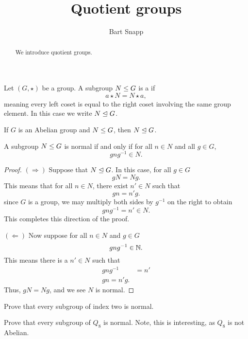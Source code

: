 \documentclass{ximera}
\author{Bart Snapp}
\title{Quotient groups}
\begin{document}
\begin{abstract}
  We introduce quotient groups.
\end{abstract}
\maketitle

\begin{definition}
  Let $(G,\star)$ be a group. A subgroup $N\leq G$ is a 
  if
  \[
  a\star N = N\star a,
  \]
  meaning every left coset is equal to the right coset involving the
  same group element. In this case we write $N\trianglelefteq G$. 
\end{definition}

\begin{corollary}
  If $G$ is an Abelian group and $N\leq G$, then $N\trianglelefteq G$.
\end{corollary}




\begin{lemma}
  A subgroup $N\leq G$ is normal if and only if for all $n\in N$ and
  all $g\in G$,
  \[
  gng^{-1}\in N.
  \]
  \begin{proof}
    $(\Rightarrow)$ Suppose that $N\trianglelefteq G$. In this case, for all
    $g\in G$
    \[
    gN = Ng.
    \]
    This means that for all $n\in N$, there exist $n'\in N$ such
    that
    \[
    g n = n'g.
    \]
    since $G$ is a group, we may multiply both sides by $g^{-1}$ on
    the right to obtain
    \[
    g n g^{-1} = n'\in N.
    \]
    This completes this direction of the proof.

    $(\Leftarrow)$ Now suppose for all $n\in N$ and $g\in G$ 
    \[
    gng^{-1} \in \mathbb N.
    \]
    This means there is a $n'\in N$ such that
    \begin{align*}
      gng^{-1}  &= n'\\
      gn = n'g.
    \end{align*}
    Thus, $gN =Ng$, and we see $N$ is normal.
  \end{proof}
\end{lemma}

\begin{exercise}
  Prove that every subgroup of index two is normal.
\end{exercise}

\begin{exercise}
  Prove that every subgroup of $Q_8$ is normal. Note, this is
  interesting, as $Q_8$ is not Abelian.
\end{exercise}
\end{document}

